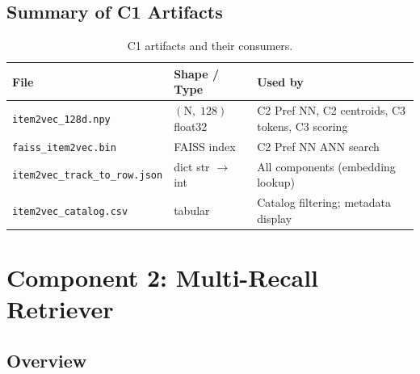 \documentclass[11pt]{article}
\newcommand{\note}[1]{\textcolor{notegreen}{\textbf{Note:} #1}}
\begin{document}




\subsection{Summary of C1 Artifacts}

\begin{table}[H]
\centering
\caption{C1 artifacts and their consumers.}
\begin{tabular}{lll}
\toprule
\textbf{File} & \textbf{Shape / Type} & \textbf{Used by} \\
\midrule
\texttt{item2vec\_128d.npy}       & $(\text{N},\;128)$ float32 &
  C2 Pref NN, C2 centroids, C3 tokens, C3 scoring \\
\texttt{faiss\_item2vec.bin}      & FAISS index &
  C2 Pref NN ANN search \\
\texttt{item2vec\_track\_to\_row.json} & dict str $\to$ int &
  All components (embedding lookup) \\
\texttt{item2vec\_catalog.csv}    & tabular &
  Catalog filtering; metadata display \\
\bottomrule
\end{tabular}
\end{table}

\section{Component 2: Multi-Recall Retriever}

\subsection{Overview}
\end{document}
